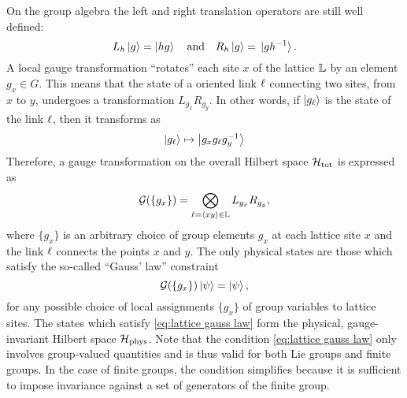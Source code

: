On the group algebra the left and right translation operators are still well defined:
\begin{equation}
    L_h \ket{g} = \ket{hg}
    \qand
    R_h \ket{g} = \ket*{gh^{-1}}.
    \label{eq:regular representations}
\end{equation}
A local gauge transformation ``rotates'' each site $x$ of the lattice $\mathbb{L}$ by an element $g_x \in G$.
This means that the state of a oriented link $\ell$ connecting two sites, from $x$ to $y$, undergoes a transformation $L_{g_x} R_{g_y}$.
In other words, if $\ket{g_{\ell}}$ is the state of the link $\ell$, then it transforms as
\begin{equation*}
    \ket{g_{\ell}} \mapsto \ket{g_x g_{\ell} g_y^{-1}}
\end{equation*}
Therefore, a gauge transformation on the overall Hilbert space $\mathcal{H}_{\text{tot}}$ is expressed as
\begin{equation}
    \label{eq:gauss law operator}
    \mathcal{G}(\{g_x\}) = \bigotimes_{\link=\ev*{xy} \in \Lattice} L_{g_{x}} R_{g_y},
\end{equation}
where $\{g_x\}$ is an arbitrary choice of group elements $g_x$ at each lattice site $x$ and the link $\ell$ connects the points $x$ and $y$.
The only physical states are those which satisfy the so-called ``Gauss' law'' constraint \cite{kogut1975hamiltonian, milstead2018qyangmills, tong2018gauge}
\begin{equation}
    \label{eq:lattice gauss law}
    \mathcal{G}(\{g_x\}) \ket{\psi}=\ket{\psi},
\end{equation}
for any possible choice of local assignments $\{g_x\}$ of group variables to lattice sites.
The states which satisfy \eqref{eq:lattice gauss law} form the physical, gauge-invariant Hilbert space $\mathcal{H}_{\text{phys}}$.
Note that the condition \eqref{eq:lattice gauss law} only involves group-valued quantities and is thus valid for both Lie groups and finite groups.
In the case of finite groups, the condition simplifies because it is sufficient to impose invariance against a set of generators of the finite group.

